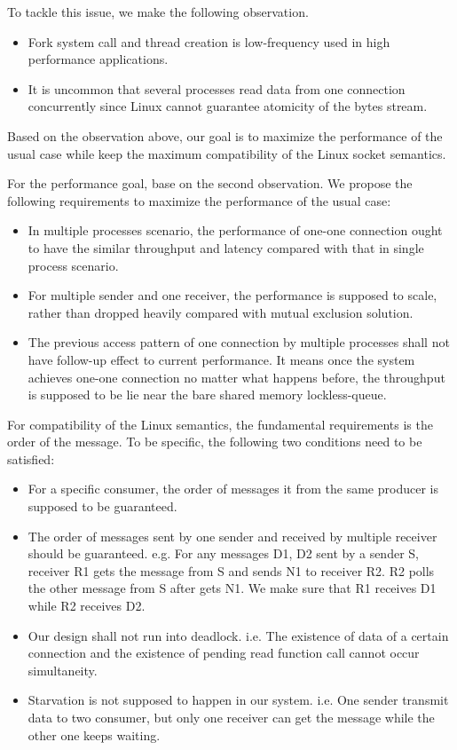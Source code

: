 To tackle this issue, we make the following observation.
\begin{itemize}
	\item Fork system call and thread creation is low-frequency used in high performance applications.
	\item It is uncommon that several processes read data from one connection concurrently since Linux cannot guarantee atomicity of the bytes stream.
\end{itemize} 

Based on the observation above, our goal is to maximize the performance of the usual case while keep the maximum compatibility of the Linux socket semantics.

For the performance goal, base on the second observation. We propose the following requirements to maximize the performance of the usual case:
\begin{itemize}
 \item In multiple processes scenario, the performance of one-one connection ought to have the similar throughput and latency compared with that in single process scenario.
 \item For multiple sender and one receiver, the performance is supposed to scale, rather than dropped heavily compared with mutual exclusion solution.
 \item The previous access pattern of one connection by multiple processes shall not have follow-up effect to current performance. It means once the system achieves one-one connection no matter what happens before, the throughput is supposed to be lie near the bare shared memory lockless-queue.
\end{itemize}

For compatibility of the Linux semantics, the fundamental requirements is the order of the message. To be specific, the following two conditions need to be satisfied:
\begin{itemize}
\item For a specific consumer, the order of messages it from the same producer is supposed to be guaranteed.
\item The order of messages sent by one sender and received by multiple receiver should be guaranteed. e.g. For any messages D1, D2 sent by a sender S, receiver R1 gets the message from S and sends N1 to receiver R2. R2 polls the other message from S after gets N1. We make sure that R1 receives D1 while R2 receives D2. 
\item Our design shall not run into deadlock. i.e. The existence of data of a certain connection and the existence of pending read function call cannot occur simultaneity.
\item Starvation is not supposed to happen in our system. i.e. One sender transmit data to two consumer, but only one receiver can get the message while the other one keeps waiting.
\end{itemize}


